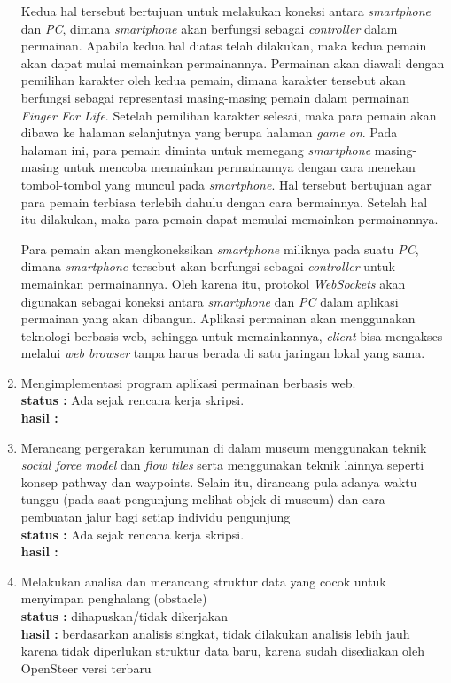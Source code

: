 \documentclass[a4paper,twoside]{article}
\begin{document}
\begin{enumerate}
		Kedua hal tersebut bertujuan untuk melakukan koneksi antara \textit{smartphone} dan \textit{PC}, dimana \textit{smartphone} akan berfungsi sebagai \textit{controller} dalam permainan. Apabila kedua hal diatas telah dilakukan, maka kedua pemain akan dapat mulai memainkan permainannya.  Permainan akan diawali dengan pemilihan karakter oleh kedua pemain, dimana karakter tersebut akan berfungsi sebagai representasi masing-masing pemain dalam permainan \textit{Finger For Life}. Setelah pemilihan karakter selesai, maka para pemain akan dibawa ke halaman selanjutnya yang berupa halaman \textit{game on}. Pada halaman ini, para pemain diminta untuk memegang \textit{smartphone} masing-masing untuk mencoba memainkan permainannya dengan cara menekan tombol-tombol yang muncul pada \textit{smartphone}. Hal tersebut bertujuan agar para pemain terbiasa terlebih dahulu dengan cara bermainnya. Setelah hal itu dilakukan, maka para pemain dapat memulai memainkan permainannya.
		
		Para pemain akan mengkoneksikan \textit{smartphone} miliknya pada suatu \textit{PC}, dimana \textit{smartphone} tersebut akan berfungsi sebagai \textit{controller} untuk memainkan permainannya. Oleh karena itu, protokol \textit{WebSockets} akan digunakan sebagai koneksi antara \textit{smartphone} dan \textit{PC} dalam aplikasi permainan yang akan dibangun. Aplikasi permainan akan menggunakan teknologi berbasis web, sehingga untuk memainkannya, \textit{client} bisa mengakses melalui \textit{web browser} tanpa harus berada di satu jaringan lokal yang sama.

		\item Mengimplementasi program aplikasi permainan berbasis web. \\
		{\bf status :} Ada sejak rencana kerja skripsi.\\
		{\bf hasil :} \\ 
		

		\item Merancang pergerakan kerumunan di dalam museum menggunakan teknik {\it social force model} dan {\it flow tiles} serta menggunakan teknik lainnya seperti konsep pathway dan waypoints. Selain itu, dirancang pula adanya waktu tunggu (pada saat pengunjung melihat objek di museum) dan cara pembuatan jalur bagi setiap individu pengunjung\\
		{\bf status :} Ada sejak rencana kerja skripsi.\\
		{\bf hasil :}

		\item Melakukan analisa dan merancang struktur data yang cocok untuk menyimpan penghalang (obstacle)\\
		{\bf status :} dihapuskan/tidak dikerjakan \\
		{\bf hasil :} berdasarkan analisis singkat, tidak dilakukan analisis lebih jauh karena tidak diperlukan struktur data baru, karena sudah disediakan oleh OpenSteer versi terbaru


\end{enumerate}
\end{document}
